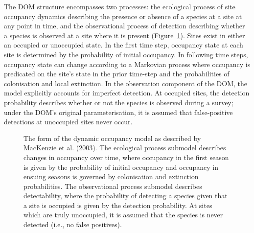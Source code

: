 \documentclass[
]{article}
\begin{document}
The DOM structure encompasses two processes: the ecological process of
site occupancy dynamics describing the presence or absence of a species
at a site at any point in time, and the observational process of
detection describing whether a species is observed at a site where it is
present (Figure~\ref{fig-modelform}). Sites exist in either an occupied
or unoccupied state. In the first time step, occupancy state at each
site is determined by the probability of initial occupancy. In following
time steps, occupancy state can change according to a Markovian process
where occupancy is predicated on the site's state in the prior time-step
and the probabilities of colonisation and local extinction. In the
observation component of the DOM, the model explicitly accounts for
imperfect detection. At occupied sites, the detection probability
describes whether or not the species is observed during a survey; under
the DOM's original parameterisation, it is assumed that false-positive
detections at unoccupied sites never occur.

\begin{figure}


\caption{\label{fig-modelform}The form of the dynamic occupancy model as
described by MacKenzie et al. (2003). The ecological process submodel
describes changes in occupancy over time, where occupancy in the first
season is given by the probability of initial occupancy and occupancy in
ensuing seasons is governed by colonisation and extinction
probabilities. The observational process submodel describes
detectability, where the probability of detecting a species given that a
site is occupied is given by the detection probability. At sites which
are truly unoccupied, it is assumed that the species is never detected
(i.e., no false positives).}

\end{figure}%
\end{document}
